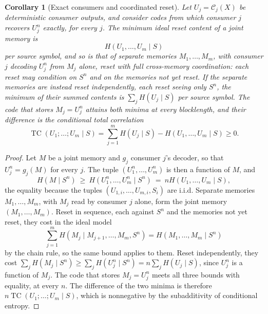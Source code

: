 \documentclass[letterpaper,onecolumn]{IEEEtran}
\newtheorem{corollary}{Corollary}
\theoremstyle{definition}
\theoremstyle{remark}
\newcommand{\cC}{\mathcal{C}}
\newcommand{\1}{\mathbf{1}}
\begin{document}
\begin{corollary}[Exact consumers and coordinated reset]\label{cor:tc}
Let $U_j=\cC_j(X)$ be deterministic consumer outputs, and consider codes from
which consumer $j$ recovers $U_j^n$ exactly, for every $j$. The minimum ideal
reset content of a joint memory is
\begin{equation}
 H(U_1,\ldots,U_m\mid S)
 \label{eq:joint-exact-work}
\end{equation}
per source symbol, and so is that of separate memories $M_1,\ldots,M_m$, with
consumer $j$ decoding $U_j^n$ from $M_j$ alone, reset with full cross-memory
coordination: each reset may condition on $S^n$ and on the memories not yet
reset. If the separate memories are instead reset independently, each reset
seeing only $S^n$, the minimum of their summed contents is
$\sum_j H(U_j\mid S)$ per source symbol. The code that stores $M_j=U_j^n$
attains both minima at every blocklength, and their difference is the
conditional total correlation
\begin{equation}
 \operatorname{TC}(U_1;\ldots;U_m\mid S)
 =\sum_{j=1}^{m}H(U_j\mid S)-H(U_1,\ldots,U_m\mid S)\ge0.
 \label{eq:conditional-tc}
\end{equation}
\end{corollary}

\begin{proof}
Let $M$ be a joint memory and $g_j$ consumer $j$'s decoder, so that
$U_j^n=g_j(M)$ for every $j$. The tuple $(U_1^n,\ldots,U_m^n)$ is then a
function of $M$, and
\begin{equation*}
 H(M\mid S^n)\ \ge\ H(U_1^n,\ldots,U_m^n\mid S^n)\ =\ nH(U_1,\ldots,U_m\mid S),
\end{equation*}
the equality because the tuples $(U_{1,i},\ldots,U_{m,i},S_i)$ are i.i.d.
Separate memories $M_1,\ldots,M_m$, with $M_j$ read by consumer $j$ alone,
form the joint memory $(M_1,\ldots,M_m)$. Reset in sequence, each against
$S^n$ and the memories not yet reset, they cost in the ideal model
\begin{equation*}
 \sum_{j=1}^{m}H(M_j\mid M_{j+1},\ldots,M_m,S^n)=H(M_1,\ldots,M_m\mid S^n)
\end{equation*}
by the chain rule, so the same bound applies to them. Reset independently,
they cost $\sum_jH(M_j\mid S^n)\ge\sum_jH(U_j^n\mid S^n)=n\sum_jH(U_j\mid S)$,
since $U_j^n$ is a function of $M_j$. The code that stores $M_j=U_j^n$ meets
all three bounds with equality, at every $n$. The difference of the two minima
is therefore $n\operatorname{TC}(U_1;\ldots;U_m\mid S)$, which is nonnegative
by the subadditivity of conditional entropy.
\end{proof}
\end{document}
